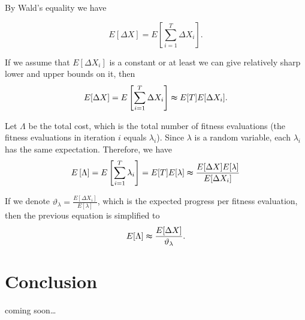\documentclass[12pt, a4paper]{article}
\theoremstyle{remark}
\theoremstyle{definition}
\newcommand{\cm}{coming soon\dots}
\begin{document}
By Wald's equality we have

\[
    E[\Delta X] = E\left[\sum_{i = 1}^{T} \Delta X_i\right].
\]

If we assume that $E[\Delta X_i]$ is a constant or at least we can give relatively sharp lower and upper bounds on it, then
\[
    E[\Delta X] = E\left[\sum_{i = 1}^{T} \Delta X_i\right] \thickapprox E[T] E[\Delta X_i].
\]

Let $\Lambda$ be the total cost, which is the total number of fitness evaluations (the fitness evaluations in iteration $i$ equals $\lambda_i$). Since $\lambda$ is a random variable, each $\lambda_i$ has the same expectation. Therefore, we have
\[
    E\left[\Lambda\right] = E\left[\sum_{i = 1}^{T} \lambda_i\right] = E[T] E[\lambda] \thickapprox \frac{E[\Delta X] E[\lambda]}{E[\Delta X_i]}
\]

If we denote $\vartheta_\lambda = \frac{E[\Delta X_i]}{E[\lambda]}$, which is the expected progress per fitness evaluation, then the previous equation is simplified to
\[
    E[\Lambda] \thickapprox \frac{E[\Delta X]}{\vartheta_\lambda}.
\]

\section{Conclusion}
\cm




\end{document}
